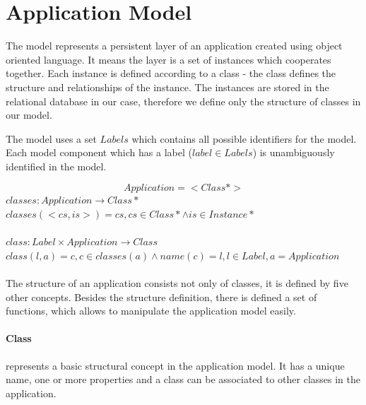 \documentclass[11pt]{article}
\begin{document}
\section{Application Model}
\label{sec:appModel}
The model represents a persistent layer of an application created using object oriented language. It means the layer is a set of instances which cooperates together. Each instance is defined according to a class - the class defines the structure and relationships of the instance. The instances are stored in the relational database in our case, therefore we define only the structure of classes in our model. 

The model uses a set $Labels$ which contains all possible identifiers for the model. Each model component which has a label ($label \in Labels$) is unambiguously identified in the model.
 
$$
Application = < Class* > 
$$
$classes : Application \rightarrow Class*$ \\
$classes(<cs, is >) = cs, cs \in Class* \wedge is \in Instance* $ \\ \\
$class : Label \times Application \rightarrow Class  $ \\ 
$class(l, a) = c, c \in classes(a) \wedge name(c) = l, l \in Label, a = Application $ \\ \\
The structure of an application consists not only of classes, it is defined by five other concepts. Besides the structure definition, there is defined a set of functions, which allows to manipulate the application model easily. 

\paragraph{Class} represents a basic structural concept in the application model. It has a unique name, one or more properties and a class can be associated to other classes in the application. 
	 
\end{document}
